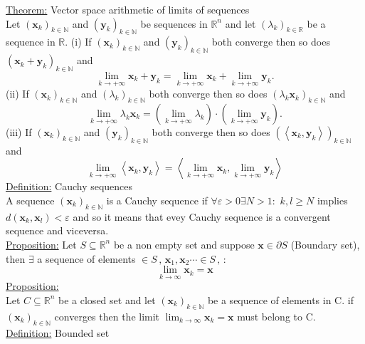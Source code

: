 \documentclass[a4paper,11pt]{article}
\begin{document}
\underline{Theorem:} Vector space arithmetic of limits of sequences\\
Let $\left(\mathbf{x}_k\right)_{k \in \mathbb{N}}$ and $\left(\mathbf{y}_k\right)_{k \in \mathbb{N}}$ be sequences in $\mathbb{R}^n$ and let $\left(\lambda_k\right)_{k \in \mathbb{R}}$ be a sequence in $\mathbb{R}$.
(i) If $\left(\mathbf{x}_k\right)_{k \in \mathbb{N}}$ and $\left(\mathbf{y}_k\right)_{k \in \mathbb{N}}$ both converge then so does $\left(\mathbf{x}_k+\mathbf{y}_k\right)_{k \in \mathbb{N}}$ and
$$
\lim _{k \rightarrow+\infty} \mathbf{x}_k+\mathbf{y}_k=\lim _{k \rightarrow+\infty} \mathbf{x}_k+\lim _{k \rightarrow+\infty} \mathbf{y}_k .
$$
(ii) If $\left(\mathbf{x}_k\right)_{k \in \mathbb{N}}$ and $\left(\lambda_k\right)_{k \in \mathbb{N}}$ both converge then so does $\left(\lambda_k \mathbf{x}_k\right)_{k \in \mathbb{N}}$ and
$$
\lim _{k \rightarrow+\infty} \lambda_k \mathbf{x}_k=\left(\lim _{k \rightarrow+\infty} \lambda_k\right) \cdot\left(\lim _{k \rightarrow+\infty} \mathbf{y}_k\right) .
$$
(iii) If $\left(\mathbf{x}_k\right)_{k \in \mathbb{N}}$ and $\left(\mathbf{y}_k\right)_{k \in \mathbb{N}}$ both converge then so does $\left(\left\langle\mathbf{x}_k, \mathbf{y}_k\right\rangle\right)_{k \in \mathbb{N}}$ and
$$
\lim _{k \rightarrow+\infty}\left\langle\mathbf{x}_k, \mathbf{y}_k\right\rangle=\left\langle\lim _{k \rightarrow+\infty} \mathbf{x}_k, \lim _{k \rightarrow+\infty} \mathbf{y}_k\right\rangle
$$
\underline{Definition:} Cauchy sequences\\
A sequence $\left(\mathbf{x}_k\right)_{k \in \mathbb{N}}$ is a Cauchy sequence if $ \forall \varepsilon > 0 \exists N > 1 : \, \, k,l \geq N $ implies $d(\mathbf{x}_k, \mathbf{x}_l) < \varepsilon$ and so it means that evey Cauchy sequence is a convergent sequence and viceversa. \\
\underline{Proposition:} Let $S \subseteq \mathbb{R}^n $ be a non empty set and suppose $\mathbf{x} \in \partial S $ (Boundary set), then $\exists$ a sequence of elements $ \in S \, , \, \mathbf{x}_1, \mathbf{x}_2 \cdots \in S \, , \, : $
$$ \lim_{k \to \infty} \mathbf{x}_k = \mathbf{x} $$
\underline{Proposition:}  \\
Let $ C \subseteq \mathbb{R}^n $ be a closed set and let $\left(\mathbf{x}_k\right)_{k \in \mathbb{N}}$ be a sequence of elements in C. if $\left(\mathbf{x}_k\right)_{k \in \mathbb{N}}$ converges then the limit $ \lim_{k \to \infty } \mathbf{x}_k = \mathbf{x} $ must belong to C. \\
\underline{Definition:} Bounded set \\
\end{document}
